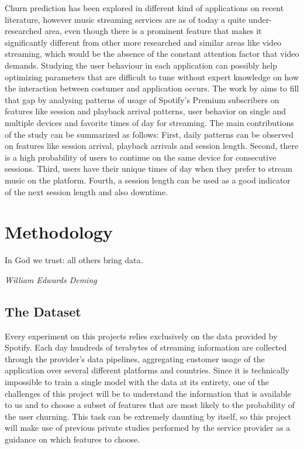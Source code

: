 \documentclass{kththesis}
\begin{document}
Churn prediction has been explored in different kind of applications on recent literature, however music streaming services are as of today a quite under-researched area, even though there is a prominent feature that makes it significantly different from other more researched and similar areas like video streaming, which would be the absence of the constant attention factor that video demands. Studying the user behaviour in each application can possibly help optimizing parameters that are difficult to tune without expert knowledge on how the interaction between costumer and application occurs. The work by \citep{Zhang2013} aims to fill that gap by analysing patterns of usage of Spotify's Premium subscribers on features like session and playback arrival patterns, user behavior on single and multiple devices and favorite times of day for streaming. The main contributions of the study can be summarized as follows: First, daily patterns can be observed on features like session arrival, playback arrivals and session length. Second, there is a high probability of users to continue on the same device for consecutive sessions. Third, users have their unique times of day when they prefer to stream music on the platform. Fourth, a session length can be used as a good indicator of the next session length and also downtime.

\chapter{Methodology}
\label{chap:method}

\epigraph{In God we trust: all others bring data.}{\textit{William Edwards Deming}}

\section{The Dataset}


Every experiment on this projects relies exclusively on the data provided by Spotify. Each day hundreds of terabytes of streaming information are collected through the provider's data pipelines, aggregating customer usage of the application over several different platforms and countries. Since it is technically impossible to train a single model with the data at its entirety, one of the challenges of this project will be to understand the information that is available to us and to choose a subset of features that are most likely to the probability of the user churning.  This task can be extremely daunting by itself, so this project will make use of previous private studies performed by the service provider as a guidance on which features to choose.
\end{document}
